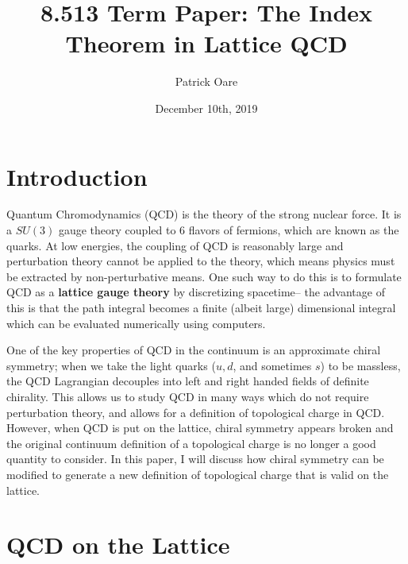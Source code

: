 \documentclass[11pt, oneside]{article}   	%
\title{8.513 Term Paper: The Index Theorem in Lattice QCD}
\author{Patrick Oare}
\date{December 10th, 2019}							%
\theoremstyle{definition}
\begin{document}
\maketitle
\section{Introduction}

Quantum Chromodynamics (QCD) is the theory of the strong nuclear force. It is a $SU(3)$ gauge theory coupled to 6 flavors of 
fermions, which are known as the quarks. At low energies, the coupling of QCD is reasonably large and perturbation theory 
cannot be applied to the theory, which means physics must be extracted by non-perturbative means. One such way to do this 
is to formulate QCD as a \textbf{lattice gauge theory} by discretizing spacetime-- the advantage of this is that the path integral 
becomes a finite (albeit large) dimensional integral which can be evaluated numerically using computers. 

One of the key properties of QCD in the continuum is an approximate chiral symmetry; when we take the light quarks ($u, d$, 
and sometimes $s$) to be massless, the QCD Lagrangian decouples into left and right handed fields of definite chirality. This 
allows us to study QCD in many ways which do not require perturbation theory, and allows for a definition of topological charge 
in QCD. However, when QCD is put on the lattice, chiral symmetry appears broken and the original continuum definition of a 
topological charge is no longer a good quantity to consider. In this paper, I will discuss how chiral symmetry can be modified to 
generate a new definition of topological charge that is valid on the lattice. 

\section{QCD on the Lattice}
\end{document}
